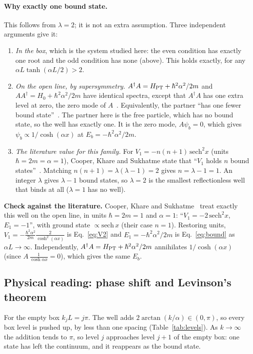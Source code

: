 \documentclass[11pt]{article}
\numberwithin{equation}{section}
\begin{document}
\paragraph{Why exactly one bound state.} This follows from $\lambda=2$; it is not an extra assumption. Three independent arguments give it:
\begin{enumerate}[label=(\roman*),itemsep=2pt]
\item \emph{In the box}, which is the system studied here: the even condition has exactly one root and the odd condition has none (above). This holds exactly, for any $\alpha L\tanh(\alpha L/2)>2$.
\item \emph{On the open line, by supersymmetry.} $A^\dagger A=H_{\rm PT}+\hbar^2\alpha^2/2m$ and $AA^\dagger=H_0+\hbar^2\alpha^2/2m$ have identical spectra, except that $A^\dagger A$ has one extra level at zero, the zero mode of $A$~\cite[p.~15, Eqs.~(12)--(14)]{CKS}. Equivalently, the partner ``has one fewer bound state''~\cite[p.~17]{CKS}. The partner here is the free particle, which has no bound state, so the well has exactly one. It is the zero mode, $A\psi_b=0$, which gives $\psi_b\propto1/\cosh(\alpha x)$ at $E_b=-\hbar^2\alpha^2/2m$.
\item \emph{The literature value for this family.} For $V_1=-n(n+1)\,\mathrm{sech}^2x$ (units $\hbar=2m=\alpha=1$), Cooper, Khare and Sukhatme state that ``$V_1$ holds $n$ bound states''~\cite[p.~77, Eq.~(312)]{CKS}. Matching $n(n+1)=\lambda(\lambda-1)=2$ gives $n=\lambda-1=1$. An integer $\lambda$ gives $\lambda-1$ bound states, so $\lambda=2$ is the smallest reflectionless well that binds at all ($\lambda=1$ has no well).
\end{enumerate}

\begin{checkbox}
\textbf{Check against the literature.} Cooper, Khare and Sukhatme~\cite[pp.~77--78]{CKS} treat exactly this well on the open line, in units $\hbar=2m=1$ and $\alpha=1$: ``$V_1=-2\,\mathrm{sech}^2x$, $E_1=-1$'', with ground state $\propto\mathrm{sech}\,x$ (their case $n=1$). Restoring units, $V_1=-\frac{\hbar^2\alpha^2}{2m}\frac{2}{\cosh^2(\alpha x)}$ is Eq.~\eqref{eq:V2} and $E_1=-\hbar^2\alpha^2/2m$ is Eq.~\eqref{eq:bound} as $\alpha L\to\infty$. Independently, $A^\dagger A=H_{\rm PT}+\hbar^2\alpha^2/2m$ annihilates $1/\cosh(\alpha x)$ (since $A\,\frac{1}{\cosh\alpha x}=0$), which gives the same $E_b$.
\end{checkbox}

\subsection{Physical reading: phase shift and Levinson's theorem}
For the empty box $k_jL=j\pi$. The well adds $2\arctan(k/\alpha)\in(0,\pi)$, so every box level is pushed up, by less than one spacing (Table~\ref{tab:levels}). As $k\to\infty$ the addition tends to $\pi$, so level $j$ approaches level $j+1$ of the empty box: one state has left the continuum, and it reappears as the bound state.
\end{document}
